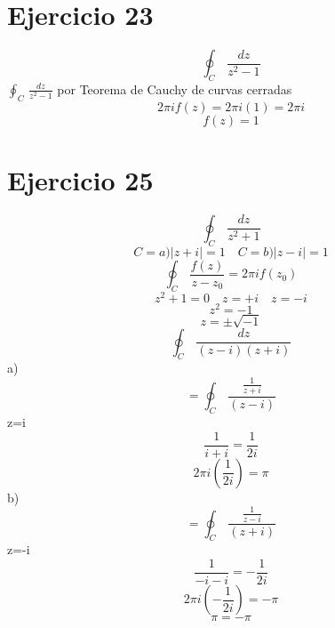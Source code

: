 \documentclass{article}
\begin{document}
\section{Ejercicio 23}
\[
\oint_{C}  \, \frac{dz}{z^2-1} 
\]
\(\oint_{C}  \, \frac{dz}{z^2-1}\) por Teorema de Cauchy de curvas cerradas
\begin{equation}
2\pi if(z)=2\pi i(1)=2\pi i
\end{equation}
\begin{equation}
f(z)=1
\end{equation}
\section{Ejercicio 25}
\[
\oint_{C}  \, \frac{dz}{z^2+1} 
\]
\begin{equation}
C=a)|z+i|=1 \quad C=b)|z-i|=1
\end{equation}
\begin{equation}
\oint_{C}  \, \frac{f(z)}{z-z_0}=2\pi i f(z_0)
\end{equation}
\begin{equation}
z^2+1=0 \quad z=+i \quad z=-i
\end{equation}
\begin{equation}
z^2=-1
\end{equation}
\begin{equation}
z=\pm\sqrt{-1}
\end{equation}
\begin{equation}
\oint_{C}  \, \frac{dz}{(z-i)(z+i)}
\end{equation}
a)
\begin{equation}
=\oint_{C}  \, \frac{\frac{1}{z+i}}{(z-i)}
\end{equation}
z=i
\begin{equation}
\frac{1}{i+i} = \frac{1}{2i}
\end{equation}
\begin{equation}
2\pi i\left(\frac{1}{2i} \right)=\pi
\end{equation}
b)
\begin{equation}
=\oint_{C}  \, \frac{\frac{1}{z-i}}{(z+i)}
\end{equation}
z=-i
\begin{equation}
\frac{1}{-i-i} = -\frac{1}{2i}
\end{equation}
\begin{equation}
2\pi i\left(-\frac{1}{2i} \right)=-\pi
\end{equation}
\begin{equation}
\pi=-\pi
\end{equation}
\end{document}
